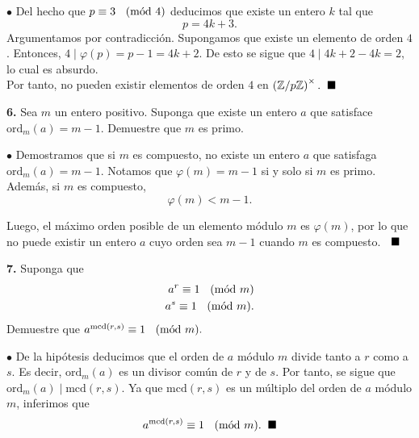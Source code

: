 \documentclass{article}
\newcommand{\Mod}[1]{\ \hspace{0.2cm} (\mathrm{m\acute{o}d}\ #1)}
\begin{document}
$\bullet$ Del hecho que $p \equiv 3 \Mod{4}$ deducimos que existe un entero $k$ tal que 
$$p = 4k + 3.$$ Argumentamos por contradicción. Supongamos que existe un elemento de orden $4$. Entonces, $4 \mid \varphi(p) = p - 1 = 4k + 2$.  De esto se sigue que $4 \mid 4k + 2 - 4k = 2$, lo cual es absurdo. \\
Por tanto, no pueden existir elementos de orden $4$ en  $\left(\mathbb{Z}/ p \mathbb{Z} \right)^{\times}. \hspace{0.2cm} \blacksquare$

\vspace{7mm}

\begin{mybox}
	\textbf{6. } Sea $m$ un entero positivo. Suponga que existe un entero $a$ que satisface $\text{ord}_{m}(a) = m - 1.$ Demuestre que $m$ es primo. 
\end{mybox}	

$\bullet$ Demostramos que si $m$ es compuesto, no existe un entero $a$ que satisfaga $\text{ord}_{m}(a) = m - 1.$ Notamos que 
$ \varphi(m) = m - 1$ si y solo si $m$ es primo. Además, si $m$ es compuesto, 
$$ \varphi(m) < m - 1 .$$

Luego, el máximo orden posible de un elemento módulo $m$ es $\varphi(m)$, por lo que no puede existir un entero $a$ cuyo orden sea $m - 1$ cuando $m$ es compuesto. $\hspace{0.2cm} \blacksquare$

\vspace{7mm}
\begin{mybox}
	\textbf{7. } Suponga que 
	\begin{equation*}
	\begin{split}
	a^r \equiv 1 \Mod{m} \\
	a^s \equiv 1 \Mod{m}. 
	\end{split}
	\end{equation*}
	\hspace{0.65cm}Demuestre que $a^{\text{mcd}(r, s)} \equiv 1 \Mod{m}.$
\end{mybox}	

$\bullet$ De la hipótesis deducimos que el orden de $a$ módulo $m$ divide tanto a $r$ como a $s$. Es decir, $\text{ord}_{m}(a)$ es un divisor común de $r$ y de $s$. Por tanto, se sigue que $\text{ord}_{m}(a) \mid \text{mcd}(r, s)$. Ya que $\text{mcd}(r, s)$ es un múltiplo del orden de $a$ módulo $m$, inferimos que
$$a^{\text{mcd}(r, s)} \equiv 1 \Mod{m}. \hspace{0.2cm} \blacksquare$$
\end{document}
